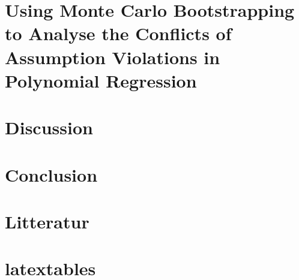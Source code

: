 \documentclass{article}
\begin{document}
	
	\section{Using Monte Carlo Bootstrapping to Analyse the Conflicts of Assumption Violations in Polynomial Regression}
	
	\newpage
	\newpage
	\section{Discussion}
	
	\newpage
	
	\section{Conclusion}
	
	\newpage
	
 	\section{Litteratur}
 	
 	\section{latextables}
 	\newpage
 	
 	
 	
\end{document}
